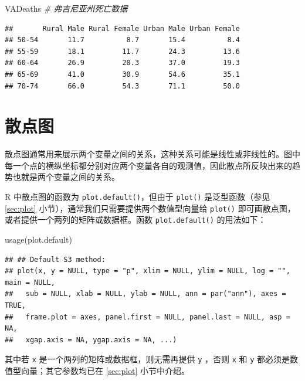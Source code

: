 \documentclass[
  b5paper,
  UTF8,twoside]{book}
\newenvironment{Shaded}{\begin{snugshade}}{\end{snugshade}}
\newcommand{\CommentTok}[1]{\textcolor[rgb]{0.56,0.35,0.01}{\textit{#1}}}
\newcommand{\FunctionTok}[1]{\textcolor[rgb]{0.00,0.00,0.00}{#1}}
\newcommand{\NormalTok}[1]{#1}
\begin{document}
\begin{Shaded}
\begin{Highlighting}[]
\NormalTok{VADeaths }\CommentTok{\# 弗吉尼亚州死亡数据}
\end{Highlighting}
\end{Shaded}

\begin{verbatim}
##       Rural Male Rural Female Urban Male Urban Female
## 50-54       11.7          8.7       15.4          8.4
## 55-59       18.1         11.7       24.3         13.6
## 60-64       26.9         20.3       37.0         19.3
## 65-69       41.0         30.9       54.6         35.1
## 70-74       66.0         54.3       71.1         50.0
\end{verbatim}

\hypertarget{sec:plot-default}{%
\section{散点图}\label{sec:plot-default}}

散点图通常用来展示两个变量之间的关系，这种关系可能是线性或非线性的。图中每一个点的横纵坐标都分别对应两个变量各自的观测值，因此散点所反映出来的趋势也就是两个变量之间的关系。

R 中散点图的函数为 \texttt{plot.default()}，但由于 \texttt{plot()} 是泛型函数（参见 \ref{sec:plot} 小节），通常我们只需要提供两个数值型向量给 \texttt{plot()} 即可画散点图，或者提供一个两列的矩阵或数据框。函数 \texttt{plot.default()} 的用法如下：

\begin{Shaded}
\begin{Highlighting}[]
\FunctionTok{usage}\NormalTok{(plot.default)}
\end{Highlighting}
\end{Shaded}

\begin{verbatim}
## ## Default S3 method:
## plot(x, y = NULL, type = "p", xlim = NULL, ylim = NULL, log = "", main = NULL,
##   sub = NULL, xlab = NULL, ylab = NULL, ann = par("ann"), axes = TRUE,
##   frame.plot = axes, panel.first = NULL, panel.last = NULL, asp = NA,
##   xgap.axis = NA, ygap.axis = NA, ...)
\end{verbatim}

其中若 \texttt{x} 是一个两列的矩阵或数据框，则无需再提供 \texttt{y} ，否则 \texttt{x} 和 \texttt{y} 都必须是数值型向量；其它参数均已在 \ref{sec:plot} 小节中介绍。
\end{document}

